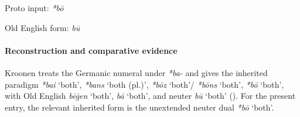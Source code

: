 \documentclass[
  british,
  a4paper,
]{article}
\providecommand{\Recon}[1]{\emph{*#1}}
\begin{document}
Proto input: \emph{*bō}

\begingroup
\setlength{\fboxsep}{6pt}

\noindent{} \endgroup

Old English form: \emph{bū}

\paragraph{Reconstruction and comparative
evidence}\label{reconstruction-and-comparative-evidence-9}

Kroonen treats the Germanic numeral under \emph{*ba-} and gives the
inherited paradigm \Recon{bai} `both', \Recon{bans} `both (pl.)',
\Recon{bōz} `both'/ \Recon{bōns} `both', \Recon{bō} `both', with Old
English {\emph{bēġen}} `both', {\emph{bā}} `both', and neuter
{\emph{bū}} `both' (). For
the present entry, the relevant inherited form is the unextended neuter
dual {\emph{*bō}} `both'.
\end{document}

